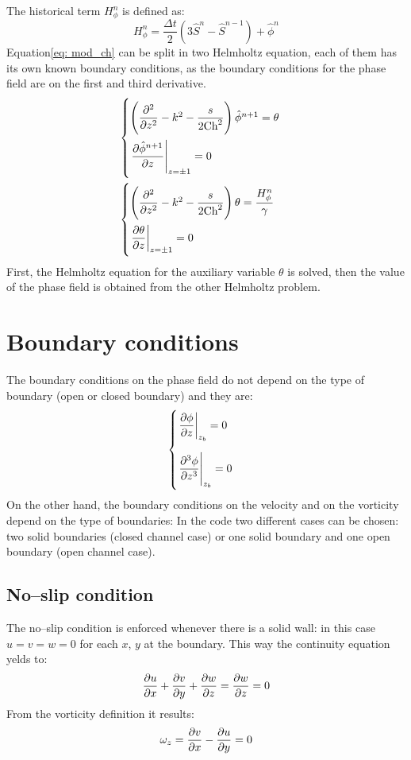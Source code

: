 The historical term $H^n_\phi$ is defined as:
\[
H^n_\phi=\frac{\Delta t}{2}(3\hat S^n-\hat S^{n-1})+\hat \phi^n
\]
Equation\ref{eq: mod_ch} can be split in two Helmholtz equation, each of them has its own known boundary conditions, as the boundary conditions for the phase field are on the first and third derivative.
\begin{equation}
\begin{array}{l}
\begin{cases}
\left(\dfrac{\partial^2}{\partial z^2}-k^2-\dfrac{s}{2\textnormal{Ch}^2}\right)\hat\phi^{n+1}=\theta \\[3ex]
\left.\dfrac{\partial \hat\phi^{n+1}}{\partial z}\right|_{z=\pm1}=0
\end{cases}
\\[8ex]
\begin{cases}
\left(\dfrac{\partial^2}{\partial z^2}-k^2-\dfrac{s}{2\textnormal{Ch}^2}\right)\theta=\dfrac{H_\phi^n}{\gamma}\\[3ex]
\left.\dfrac{\partial \theta}{\partial z}\right|_{z=\pm1}=0
\end{cases}
\end{array}
\end{equation}
First, the Helmholtz equation for the auxiliary variable $\theta$ is solved, then the value of the phase field is obtained from the other Helmholtz problem.

\section{Boundary conditions}
The boundary conditions on the phase field do not depend on the type of boundary (open or closed boundary) and they are:
\[
\begin{cases}
\left.\dfrac{\partial \phi}{\partial z}\right|_{z_b}=0\\[4ex]
\left.\dfrac{\partial^3 \phi}{\partial z^3}\right|_{z_b}=0\\
\end{cases}
\]
On the other hand, the boundary conditions on the velocity and on the vorticity depend on the type of boundaries: In the code two different cases can be chosen: two solid boundaries (closed channel case) or one solid boundary and one open boundary (open channel case).

\subsection{No--slip condition}
The no--slip condition is enforced whenever there is a solid wall: in this case $u=v=w=0$ for each $x$, $y$ at the boundary. This way the continuity equation yelds to:
\[
\frac{\partial u}{\partial x}+\frac{\partial v}{\partial y}+\frac{\partial w}{\partial z}=\frac{\partial w}{\partial z}=0
\]
From the vorticity definition it results:
\[
\omega_z=\frac{\partial v}{\partial x}-\frac{\partial u}{\partial y}=0
\]

